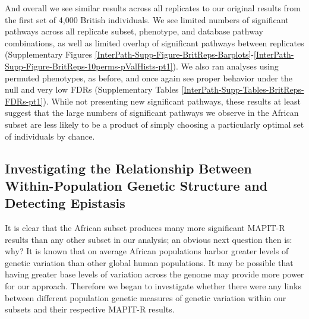 \documentclass[12pt,a4paper]{article}
\begin{document}
And overall we see similar results across all replicates to our original results from the first set of 4,000 British individuals. We see limited numbers of significant pathways across all replicate subset, phenotype, and database pathway combinations, as well as limited overlap of significant pathways between replicates (Supplementary Figures \ref{InterPath-Supp-Figure-BritReps-Barplots}-\ref{InterPath-Supp-Figure-BritReps-10perms-pValHists-pt1}). We also ran analyses using permuted phenotypes, as before, and once again see proper behavior under the null and very low FDRs (Supplementary Tables \ref{InterPath-Supp-Tables-BritReps-FDRs-pt1}). While not presenting new significant pathways, these results at least suggest that the large numbers of significant pathways we observe in the African subset are less likely to be a product of simply choosing a particularly optimal set of individuals by chance.  

\subsection{Investigating the Relationship Between Within-Population Genetic Structure and Detecting Epistasis}

It is clear that the African subset produces many more significant MAPIT-R results than any other subset in our analysis; an obvious next question then is: why? It is known that on average African populations harbor greater levels of genetic variation than other global human populations. It may be possible that having greater base levels of variation across the genome may provide more power for our approach. Therefore we began to investigate whether there were any links between different population genetic measures of genetic variation within our subsets and their respective MAPIT-R results.
\end{document}
